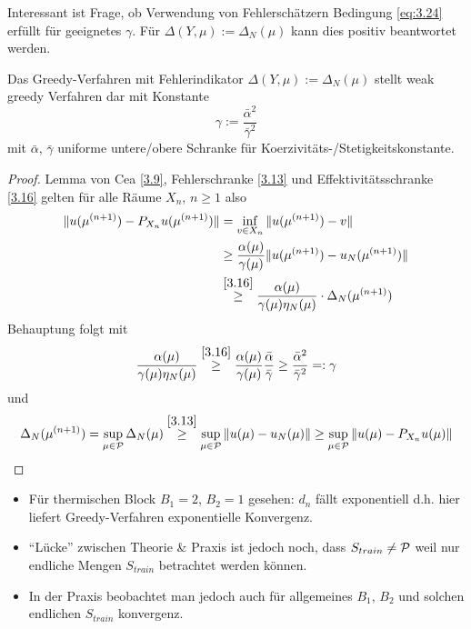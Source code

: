 Interessant ist Frage, ob Verwendung von Fehlerschätzern Bedingung \eqref{eq:3.24} erfüllt für geeignetes $\gamma$.
Für $\Delta(Y,\mu) := \Delta_N(\mu)$ kann dies positiv beantwortet werden.

\begin{satz}
	Das Greedy-Verfahren mit Fehlerindikator $\Delta(Y,\mu) := \Delta_N(\mu)$ stellt weak greedy Verfahren dar mit Konstante
	\[
		\gamma := \frac{\bar\alpha^2}{\bar\gamma^2}
	\]
	mit $\bar\alpha$, $\bar\gamma$ uniforme untere/obere Schranke für Koerzivitäts-/Stetigkeitskonstante.

	\begin{proof}
		Lemma von Cea \ref{3.9}, Fehlerschranke \ref{3.13} und Effektivitätsschranke \ref{3.16} gelten für alle Räume $X_n$, $n \geq 1$ also
		\begin{align*}
			\|u(\mu^{(n+1)})-P_{X_n} u(\mu^{(n+1)})\| &= \inf_{v \in X_n} \|u(\mu^{(n+1)})-v\| \\
			&\geq \frac{\alpha(\mu)}{\gamma(\mu)} \|u(\mu^{(n+1)}) - u_N(\mu^{(n+1)})\| \\
			&\stackrel{\ref{3.16}}{\geq} \frac{\alpha(\mu)}{\gamma(\mu) \eta_N(\mu)} \cdot \Delta_N(\mu^{(n+1)})
		\end{align*}
		Behauptung folgt mit
		\[
			\frac{\alpha(\mu)}{\gamma(\mu) \eta_N(\mu)} \stackrel{\ref{3.16}}{\geq} \frac{\alpha(\mu)}{\gamma(\mu)} \frac{\bar\alpha}{\bar\gamma} \geq \frac{\bar\alpha^2}{\bar\gamma^2} =: \gamma
		\]
		und
		\[
			\Delta_N(\mu^{(n+1)}) = \sup_{\mu \in \mathcal{P}} \Delta_N(\mu) \stackrel{\ref{3.13}}{\geq} \sup_{\mu \in \mathcal{P}} \|u(\mu)-u_N(\mu)\| \geq \sup_{\mu \in \mathcal{P}} \|u(\mu)-P_{X_n} u(\mu)\|
		\]
	\end{proof}
\end{satz}

\begin{bem} \beginwithlistbem
	\begin{itemize}
		\item Für thermischen Block $B_1 = 2$, $B_2 = 1$ gesehen: $d_n$ fällt exponentiell d.h. hier liefert Greedy-Verfahren exponentielle Konvergenz.
		\item ``Lücke'' zwischen Theorie \& Praxis ist jedoch noch, dass $S_{train} \neq \mathcal{P}$ weil nur endliche Mengen $S_{train}$ betrachtet werden können.
		\item In der Praxis beobachtet man jedoch auch für allgemeines $B_1$, $B_2$ und solchen endlichen $S_{train}$ konvergenz.
	\end{itemize}
\end{bem}

